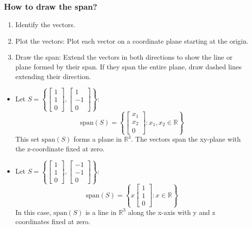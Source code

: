     \subsubsection{How to draw the span?}
    \begin{process}
        \begin{enumerate}
            \item Identify the vectors.
            \item Plot the vectors: Plot each vector on a coordinate plane starting at the origin.
            \item Draw the span: Extend the vectors in both directions to show the line or plane formed by their span. If they span the entire plane, draw dashed lines extending their direction.
        \end{enumerate}
    \end{process}

    \begin{example}
        \begin{itemize}
            \item Let \( S = \left\{ \begin{bmatrix} 1 \\ 1 \\ 0 \end{bmatrix}, \begin{bmatrix} 1 \\ -1 \\ 0 \end{bmatrix} \right\} \):
            \[
            \text{span}(S) = \left\{ \begin{bmatrix} x_1 \\ x_2 \\ 0 \end{bmatrix} : x_1, x_2 \in \mathbb{R} \right\}
            \]
            This set \( \text{span}(S) \) forms a plane in \( \mathbb{R}^3 \). The vectors span the xy-plane with the z-coordinate fixed at zero.
        
            \item Let \( S = \left\{ \begin{bmatrix} 1 \\ 1 \\ 0 \end{bmatrix}, \begin{bmatrix} -1 \\ -1 \\ 0 \end{bmatrix} \right\} \):
            \[
            \text{span}(S) = \left\{ x \begin{bmatrix} 1 \\ 1\\ 0 \end{bmatrix} : x \in \mathbb{R} \right\}
            \]
            In this case, \( \text{span}(S) \) is a line in \( \mathbb{R}^3 \) along the x-axis with y and z coordinates fixed at zero.
        \end{itemize}
    
\end{example}

